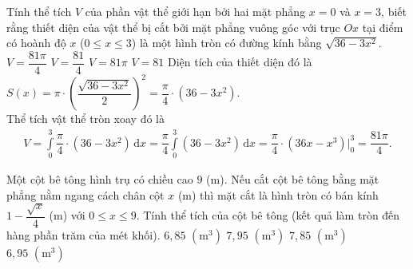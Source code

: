 \begin{ex}%
	Tính thể tích $V$ của phần vật thể giới hạn bởi hai mặt phẳng $x=0$ và $x=3$, biết rằng thiết diện của vật thể bị cắt bởi mặt phẳng vuông góc với trục $Ox$ tại điểm có hoành độ $x$ ($0\leq x \leq 3$) là một hình tròn có đường kính bằng $\sqrt{36-3x^2}$.
	\choice
	{\True $V=\dfrac{81\pi}{4}$}
	{$V=\dfrac{81}{4}$}
	{$V=81\pi$}
	{$V=81$}
	\loigiai
	{
		Diện tích của thiết diện đó là $S(x)=\pi\cdot \left(\dfrac{\sqrt{36-3x^2}}{2}\right)^2 = \dfrac{\pi}{4}\cdot(36-3x^2)$.\\
		Thể tích vật thể tròn xoay đó là
		\begin{eqnarray*}
			V=\displaystyle\int\limits_0^3\dfrac{\pi}{4}\cdot(36-3x^2)\mathrm{\,d}x = \dfrac{\pi}{4} \displaystyle\int\limits_0^3(36-3x^2)\mathrm{\,d}x = \dfrac{\pi}{4}\cdot(36x-x^3)\bigg|_0^3 = \dfrac{81\pi}{4}.
		\end{eqnarray*}
	}
\end{ex}

\begin{ex}%
	Một cột bê tông hình trụ có chiều cao $9$ (m). Nếu cắt cột bê tông bằng mặt phẳng nằm ngang cách chân cột $x$ (m) thì mặt cắt là hình tròn có bán kính $1-\dfrac{\sqrt{x}}{4}$ (m) với $0\leq x \leq 9$. Tính thể tích của cột bê tông (kết quả làm tròn đến hàng phần trăm của mét khối).
	\choice
	{$6{,}85\,\,\left(\mathrm{m}^{3}\right)$}
	{\True $7{,}95\,\,\left(\mathrm{m}^{3}\right)$}
	{$7{,}85\,\,\left(\mathrm{m}^{3}\right)$}
	{$6{,}95\,\,\left(\mathrm{m}^{3}\right)$}
\end{ex}

